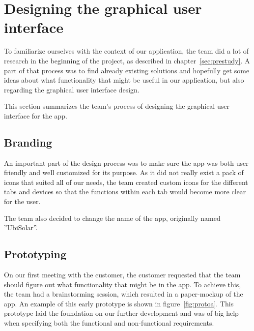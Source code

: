 \section{Designing the graphical user interface}
To familiarize ourselves with the context of our application, the team did a lot of research in the beginning of the project, as described in chapter~\ref{sec:prestudy}. A part of that process was to find already existing solutions and hopefully get some ideas about what functionality that might be useful in our application, but also regarding the graphical user interface design.

This section summarizes the team's process of designing the graphical user interface for the app.

\subsection{Branding}
An important part of the design process was to make sure the app was both user friendly and well customized for its purpose. As it did not really exist a pack of icons that suited all of our needs, the team created custom icons for the different tabs and devices so that the functions within each tab would become more clear for the user.

The team also decided to change the name of the app, originally named ''UbiSolar''.



\subsection{Prototyping}
On our first meeting with the customer, the customer requested that the team should figure out what functionality that might be in the app. To achieve this, the team had a brainstorming session, which resulted in a paper-mockup of the app. An example of this early prototype is shown in figure~\ref{fig:protoa}. This prototype laid the foundation on our further development and was of big help when specifying both the functional and non-functional requirements.

